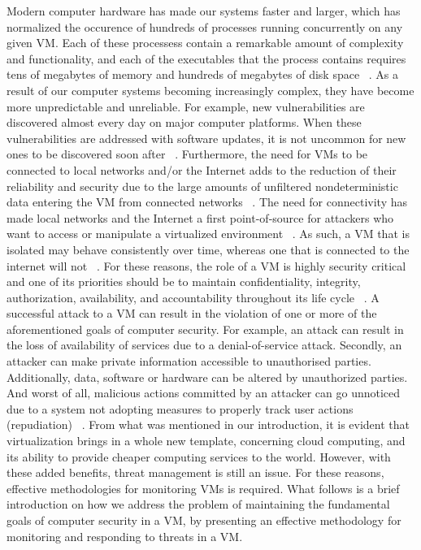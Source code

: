 \documentclass{report}
\begin{document}
\begin{spacing}{1.5}
{\large 
Modern computer hardware has made our systems faster and larger, which has normalized the occurence of hundreds of processes running concurrently on any given VM. Each of these processess contain a remarkable amount of complexity and functionality, and each of the executables that the process contains requires tens of megabytes of memory and hundreds of megabytes of disk space ~\cite{somayaji2002operating}. As a result of our computer systems becoming increasingly complex, they have become more unpredictable and unreliable. For example, new vulnerabilities are discovered almost every day on major computer platforms. When these vulnerabilities are addressed with software updates, it is not uncommon for new ones to be discovered soon after ~\cite{somayaji2002operating}. Furthermore, the need for VMs to be connected to local networks and/or the Internet adds to the reduction of their reliability and security due to the large amounts of unfiltered nondeterministic data entering the VM from connected networks ~\cite{somayaji2002operating}. The need for connectivity has made local networks and the Internet a first point-of-source for attackers who want to access or manipulate a virtualized environment ~\cite{win2014virtual}. As such, a VM that is isolated may behave consistently over time, whereas one that is connected to the internet will not ~\cite{somayaji2002operating}. For these reasons, the role of a VM is highly security critical and one of its priorities should be to maintain confidentiality, integrity, authorization, availability, and accountability throughout its life cycle ~\cite{van2021computer}. A successful attack to a VM can result in the violation of one or more of the aforementioned goals of computer security. For example, an attack can result in the loss of availability of services due to a denial-of-service attack. Secondly, an attacker can make private information accessible to unauthorised parties. Additionally, data, software or hardware can be altered by unauthorized parties. And worst of all, malicious actions committed by an attacker can go unnoticed due to a system not adopting measures to properly track user actions (repudiation) ~\cite{van2021computer}. From what was mentioned in our introduction, it is evident that virtualization brings in a whole new template, concerning cloud computing, and its ability to provide cheaper computing services to the world. However, with these added benefits, threat management is still an issue. For these reasons, effective methodologies for monitoring VMs is required. What follows is a brief introduction on how we address the problem of maintaining the fundamental goals of computer security in a VM, by presenting an effective methodology for monitoring and responding to threats in a VM.
\newline
}





\end{spacing}
\end{document}
